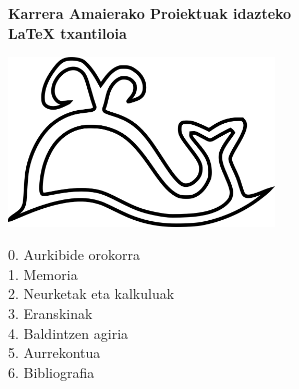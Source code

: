 %

\AddToShipoutPicture*{\chapterback}
\begin{titlepage}
\thispagestyle{empty}
\vspace*{1em}
\begin{minipage}{\textwidth}\end{minipage}

\begin{center}
\vspace*{25pt}

\begin{minipage}{.8\textwidth}
\centering
\LARGE
{\bfseries Karrera Amaierako Proiektuak idazteko\\\LaTeX{} txantiloia}

\vspace*{25pt}
\includegraphics[width=200pt]{./images/logo.png}
\end{minipage}

\vspace{25pt}
\hspace{3em}
\begin{minipage}{.425\textwidth}
\LARGE
0. Aurkibide orokorra\\
1. Memoria\\
2. Neurketak eta kalkuluak\\
3. Eranskinak\\
4. Baldintzen agiria\\
5. Aurrekontua\\
6. Bibliografia\\
\end{minipage}
\end{center}

\begin{minipage}{\textwidth}\end{minipage}
\end{titlepage}
\clearpage
